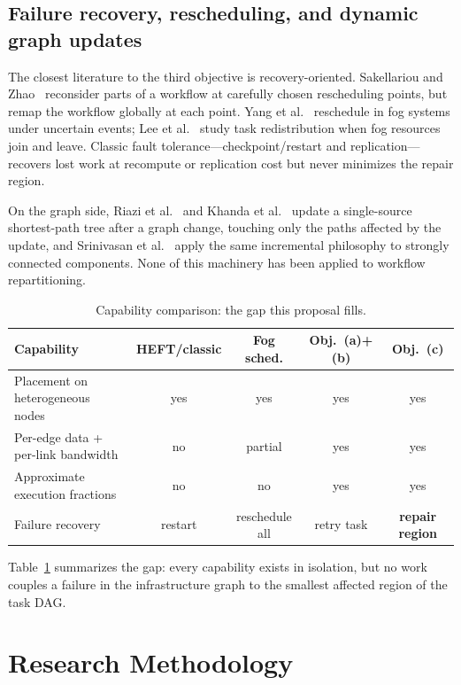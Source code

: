 \documentclass[11pt]{article}
\begin{document}
\subsection{Failure recovery, rescheduling, and dynamic graph
updates}

The closest literature to the third objective is
recovery-oriented. Sakellariou and
Zhao~\cite{sakellariou2004rescheduling} reconsider parts of a
workflow at carefully chosen rescheduling points, but remap the
workflow globally at each point. Yang et
al.~\cite{yang2024multiagent} reschedule in fog systems under
uncertain events; Lee et al.~\cite{lee2019fognetwork} study task
redistribution when fog resources join and leave. Classic fault
tolerance---checkpoint/restart and replication---recovers lost
work at recompute or replication cost but never minimizes the
repair region.

On the graph side, Riazi et al.~\cite{riazi2018sssp} and Khanda
et al.~\cite{khanda2021sssp} update a single-source
shortest-path tree after a graph change, touching only the paths
affected by the update, and Srinivasan et
al.~\cite{srinivasan2023scc} apply the same incremental
philosophy to strongly connected components. None of this
machinery has been applied to workflow repartitioning.

\begin{table}[t]
\centering\footnotesize
\caption{Capability comparison: the gap this proposal fills.}
\label{tab:gap}
\begin{tabular}{@{}p{4.2cm}cccc@{}}
\toprule
Capability & HEFT/classic & Fog sched. &
Obj.\ (a)+(b) & Obj.\ (c) \\
\midrule
Placement on heterogeneous nodes & yes & yes & yes & yes \\
Per-edge data + per-link bandwidth & no & partial & yes & yes \\
Approximate execution fractions & no & no & yes & yes \\
Failure recovery & restart & reschedule all
& retry task & \textbf{repair region} \\
\bottomrule
\end{tabular}
\end{table}

Table~\ref{tab:gap} summarizes the gap: every capability exists
in isolation, but no work couples a failure in the
infrastructure graph to the smallest affected region of the
task DAG.

\section{Research Methodology}
\label{sec:method}
\end{document}
